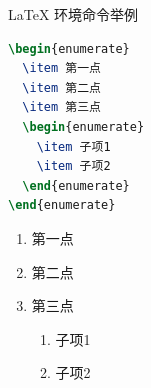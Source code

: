\documentclass{beamer}  %
\begin{document}
\begin{frame}[fragile]{\LaTeX{} 环境命令举例}
    \begin{minipage}{0.5\linewidth}
\begin{lstlisting}[language=TeX]
\begin{enumerate}
  \item 第一点
  \item 第二点
  \item 第三点
  \begin{enumerate}
    \item 子项1
    \item 子项2
  \end{enumerate}
\end{enumerate}
\end{lstlisting}
    \end{minipage}\hspace{1cm}
    \begin{minipage}{0.3\linewidth}
        \begin{enumerate}
            \item 第一点
            \item 第二点
            \item 第三点
            \begin{enumerate}
                \item 子项1
                \item 子项2
            \end{enumerate}
        \end{enumerate}
    \end{minipage}
    \medskip
\end{frame}
\end{document}
